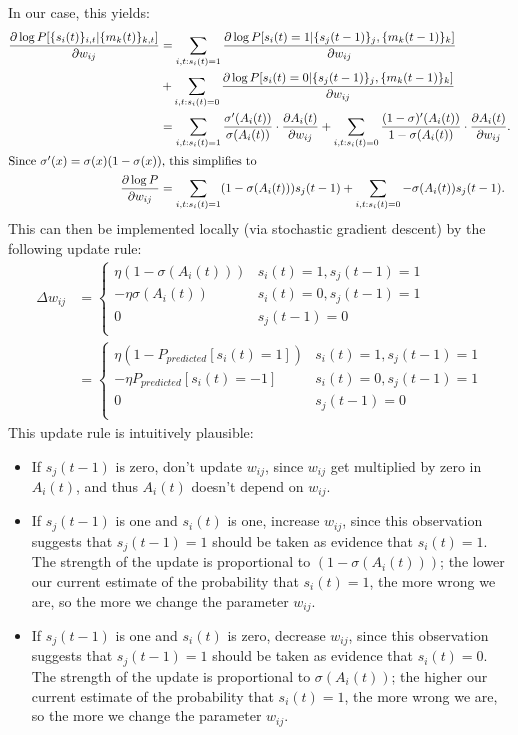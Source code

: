 \documentclass{article}
\theoremstyle{definition}
\begin{document}
In our case, this yields:
\begin{align*}
\frac{\partial \log P[\{s_i(t)\}_{i,t} | \{m_k(t)\}_{k,t}]}{\partial w_{ij}}
&= \sum_{i,t: s_i(t)=1} \frac{\partial \log P[s_i(t)=1 | \{s_j(t-1)\}_j, \{m_k(t-1)\}_k]}{\partial w_{ij}} \\
& + \sum_{i,t: s_i(t)=0} \frac{\partial \log P[s_i(t)=0 | \{s_j(t-1)\}_j, \{m_k(t-1)\}_k]}{\partial w_{ij}} \\
&= \sum_{i,t: s_i(t)=1} \frac{\sigma'(A_i(t))}{\sigma(A_i(t))}
\cdot \frac{\partial A_i(t)}{\partial w_{ij}} + \sum_{i,t: s_i(t)=0}
\frac{(1-\sigma)'(A_i(t))}{1-\sigma(A_i(t))} \cdot \frac{\partial
  A_i(t)}{\partial w_{ij}}.\\
\intertext{Since $\sigma'(x) = \sigma(x)(1-\sigma(x))$, this simplifies to}
\frac{\partial \log P}{\partial w_{ij}}
&= \sum_{i,t: s_i(t)=1} (1 - \sigma(A_i(t))) s_j(t-1) + \sum_{i,t: s_i(t)=0}
-\sigma(A_i(t)) s_j(t-1).\\
\end{align*}
This can then be implemented locally (via stochastic gradient descent)
by the following update rule: 
\begin{align*}
\Delta w_{ij} &= \begin{cases} \eta (1-\sigma(A_i(t))) & s_i(t)=1, s_j(t-1)=1 \\
-\eta \sigma(A_i(t)) & s_i(t)=0, s_j(t-1)=1 \\
0 & s_j(t-1)=0\\
\end{cases}\\
&=  \begin{cases} \eta (1-P_{predicted}[s_i(t)=1]) & s_i(t)=1, s_j(t-1)=1 \\
-\eta P_{predicted}[s_i(t)=-1] & s_i(t)=0, s_j(t-1)=1 \\
0 & s_j(t-1)=0\\
\end{cases}
\end{align*}
This update rule is intuitively plausible:
\begin{itemize}
\item If $s_j(t-1)$ is zero, don't update $w_{ij}$, since $w_{ij}$ get
  multiplied by zero in $A_i(t)$, and thus $A_i(t)$ doesn't depend on
  $w_{ij}$.
\item If $s_j(t-1)$ is one and $s_i(t)$ is one, increase $w_{ij}$,
  since this observation suggests that $s_j(t-1)=1$ should be taken as
  evidence that $s_i(t)=1$. The strength of the update is proportional
  to $(1 - \sigma(A_i(t)))$; the lower our current estimate of the
  probability that $s_i(t)=1$, the more wrong we are, so the more we
  change the parameter $w_{ij}$.
\item If $s_j(t-1)$ is one and $s_i(t)$ is zero, decrease $w_{ij}$,
  since this observation suggests that $s_j(t-1)=1$ should be taken as
  evidence that $s_i(t)=0$. The strength of the update is proportional
  to $\sigma(A_i(t))$; the higher our current estimate of the
  probability that $s_i(t)=1$, the more wrong we are, so the more we
  change the parameter $w_{ij}$.
\end{itemize}
\end{document}
